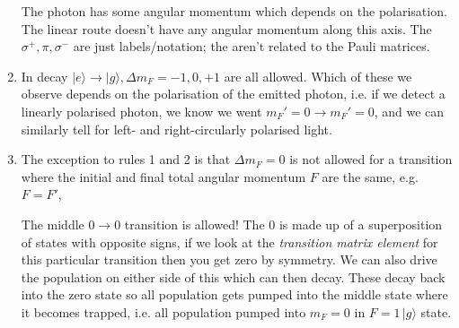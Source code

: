 \documentclass[a4paper, 11pt, normalem]{report}
\begin{document}
\begin{enumerate}
\begin{figure}[H]
        \end{figure}
        The photon has some angular momentum which depends on the polarisation.
        The linear route doesn't have any angular momentum along this axis.
        The $\sigma^+,\pi,\sigma^-$ are just labels/notation; the aren't related to the Pauli matrices.
    \item In decay $|e\rangle\to|g\rangle,\Delta m_F=-1,0,+1$ are all allowed.
        Which of these we observe depends on the polarisation of the emitted photon, i.e. if we detect a linearly polarised photon, we know we went $m_F'=0\to m_F'=0$, and we can similarly tell for left- and right-circularly polarised light.
    \item The exception to rules 1 and 2 is that $\Delta m_F=0$ is not allowed for a transition where the initial and final total angular momentum $F$ are the same, e.g. $F=F'$,
        \begin{figure}[H]
            \centering
        \end{figure}
        The middle $0\to0$ transition is  allowed!
        The $0$ is made up of a superposition of states with opposite signs, if we look at the \emph{transition matrix element} for this particular transition then you get zero by symmetry.
        We can also drive the population on either side of this which can then decay.
        These  decay back into the zero state so all population gets pumped into the middle state where it becomes trapped, i.e. all population pumped into $m_F=0$ in $F=1\,|g\rangle$ state.
\end{enumerate}
\end{document}
